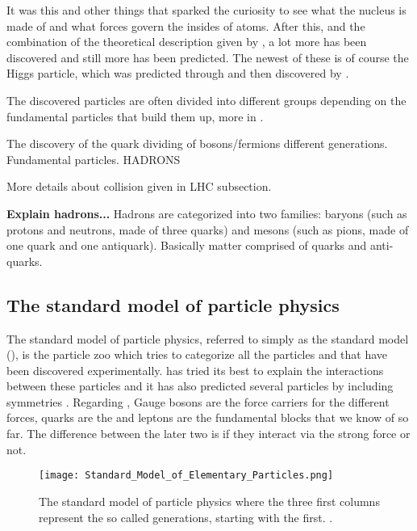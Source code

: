 It was this and other things that sparked the curiosity to see what the nucleus is made of and what forces govern the insides of atoms. After this, and the combination of the theoretical description given by \abbrQM, a lot more has been discovered and still more has been predicted. The newest of these is of course the Higgs particle, which was predicted through \abbrQFT and then discovered by \abbrCERN \citep{Higgs:2012}. 

The discovered particles are often divided into different groups depending on the fundamental particles that build them up, more in .

The discovery of the quark dividing of bosons/fermions different generations. Fundamental particles. HADRONS

More details about collision given in LHC subsection.

\textbf{Explain hadrons...}
Hadrons are categorized into two families: baryons (such as protons and neutrons, made of three quarks) and mesons (such as pions, made of one quark and one antiquark).
Basically matter comprised of quarks and anti-quarks.

\subsection{The standard model of particle physics}\label{sec:tb:subsec:SM}
The standard model of particle physics, referred to simply as the standard model (\abbrSM), is the particle zoo which tries to categorize all the particles and that have been discovered experimentally. \abbrQFT has tried its best to explain the interactions between these particles and it has also predicted several particles by including symmetries \citep{Burchan:1995}. Regarding \abbrSM, Gauge bosons are the force carriers for the different forces, quarks are the and leptons are the fundamental blocks that we know of so far. The difference between the later two is if they interact via the strong force or not. 
\begin{SCfigure}[][h]
 \centering
\texttt{[image: Standard\_Model\_of\_Elementary\_Particles.png]}
  \caption{{\small The standard model of particle physics where the three first columns represent the so called generations, starting with the first. \citep{wiki1}.}}
    \label{fig:SM}
\end{SCfigure}

